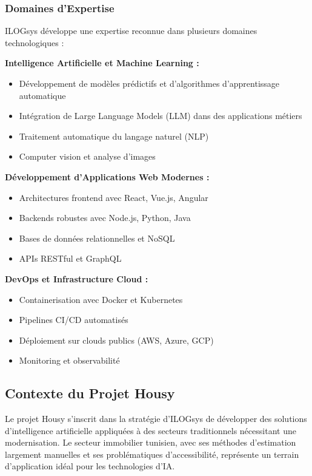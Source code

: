 \subsubsection{Domaines d'Expertise}

ILOGsys développe une expertise reconnue dans plusieurs domaines technologiques :

\textbf{Intelligence Artificielle et Machine Learning :}
\begin{itemize}
    \item Développement de modèles prédictifs et d'algorithmes d'apprentissage automatique
    \item Intégration de Large Language Models (LLM) dans des applications métiers
    \item Traitement automatique du langage naturel (NLP)
    \item Computer vision et analyse d'images
\end{itemize}

\textbf{Développement d'Applications Web Modernes :}
\begin{itemize}
    \item Architectures frontend avec React, Vue.js, Angular
    \item Backends robustes avec Node.js, Python, Java
    \item Bases de données relationnelles et NoSQL
    \item APIs RESTful et GraphQL
\end{itemize}

\textbf{DevOps et Infrastructure Cloud :}
\begin{itemize}
    \item Containerisation avec Docker et Kubernetes
    \item Pipelines CI/CD automatisés
    \item Déploiement sur clouds publics (AWS, Azure, GCP)
    \item Monitoring et observabilité
\end{itemize}

\subsection{Contexte du Projet Housy}

Le projet Housy s'inscrit dans la stratégie d'ILOGsys de développer des solutions d'intelligence artificielle appliquées à des secteurs traditionnels nécessitant une modernisation. Le secteur immobilier tunisien, avec ses méthodes d'estimation largement manuelles et ses problématiques d'accessibilité, représente un terrain d'application idéal pour les technologies d'IA.


